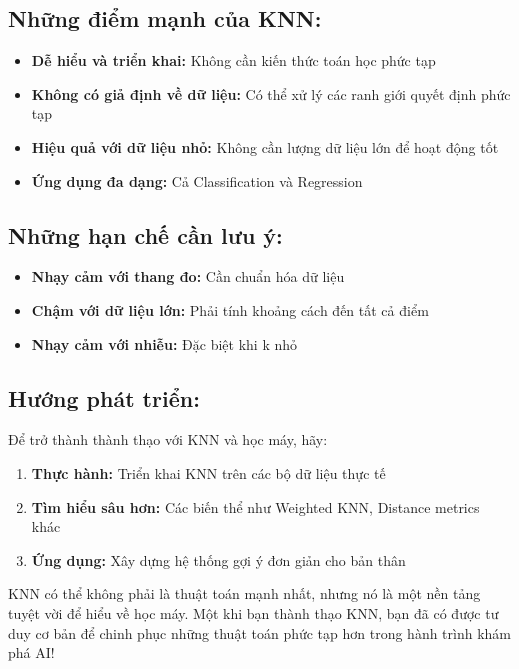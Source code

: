 \subsection{Những điểm mạnh của KNN:}
\begin{itemize}
\item \textbf{Dễ hiểu và triển khai:} Không cần kiến thức toán học phức tạp
\item \textbf{Không có giả định về dữ liệu:} Có thể xử lý các ranh giới quyết định phức tạp
\item \textbf{Hiệu quả với dữ liệu nhỏ:} Không cần lượng dữ liệu lớn để hoạt động tốt
\item \textbf{Ứng dụng đa dạng:} Cả Classification và Regression
\end{itemize}

\subsection{Những hạn chế cần lưu ý:}
\begin{itemize}
\item \textbf{Nhạy cảm với thang đo:} Cần chuẩn hóa dữ liệu
\item \textbf{Chậm với dữ liệu lớn:} Phải tính khoảng cách đến tất cả điểm
\item \textbf{Nhạy cảm với nhiễu:} Đặc biệt khi k nhỏ
\end{itemize}

\subsection{Hướng phát triển:}

Để trở thành thành thạo với KNN và học máy, hãy:
\begin{enumerate}
\item \textbf{Thực hành:} Triển khai KNN trên các bộ dữ liệu thực tế
\item \textbf{Tìm hiểu sâu hơn:} Các biến thể như Weighted KNN, Distance metrics khác
\item \textbf{Ứng dụng:} Xây dựng hệ thống gợi ý đơn giản cho bản thân
\end{enumerate}

KNN có thể không phải là thuật toán mạnh nhất, nhưng nó là một nền tảng tuyệt vời để hiểu về học máy. Một khi bạn thành thạo KNN, bạn đã có được tư duy cơ bản để chinh phục những thuật toán phức tạp hơn trong hành trình khám phá AI!
